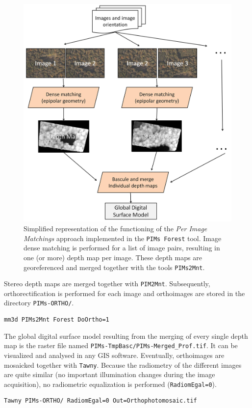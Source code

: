 \begin{figure}
\centering
\includegraphics[width=0.8\linewidth]{FIGS/UASGrandLeez/PIMsGL.jpg}
\caption{Simplified representation of the functioning of the \textit{Per Image Matchings} approach implemented in the {\tt PIMs Forest} tool.
Image dense matching is performed for a list of image pairs, resulting in one (or more) depth map per image.
These depth maps are georeferenced and merged together with the tools {\tt PIMs2Mnt}. }
\label{FIG:pimsGL}
\end{figure}

Stereo depth maps are merged together with {\tt PIM2Mnt}. 
Subsequently, orthorectification is performed for each image and orthoimages are stored in the directory { \tt PIMs-ORTHO/}.

\begin{verbatim}
mm3d PIMs2Mnt Forest DoOrtho=1
\end{verbatim}

The global digital surface model resulting from the merging of every single depth map is the raster file named {\tt PIMs-TmpBasc/PIMs-Merged\_Prof.tif}.
It can be visualized and analysed in any GIS software. 
Eventually, orthoimages are mosaicked together with {\tt Tawny}.
Because the radiometry of the different images are quite similar (no important illumination changes during the image acquisition), no radiometric equalization is performed ({\tt RadiomEgal=0}).

\begin{verbatim}
Tawny PIMs-ORTHO/ RadiomEgal=0 Out=Orthophotomosaic.tif
\end{verbatim}

